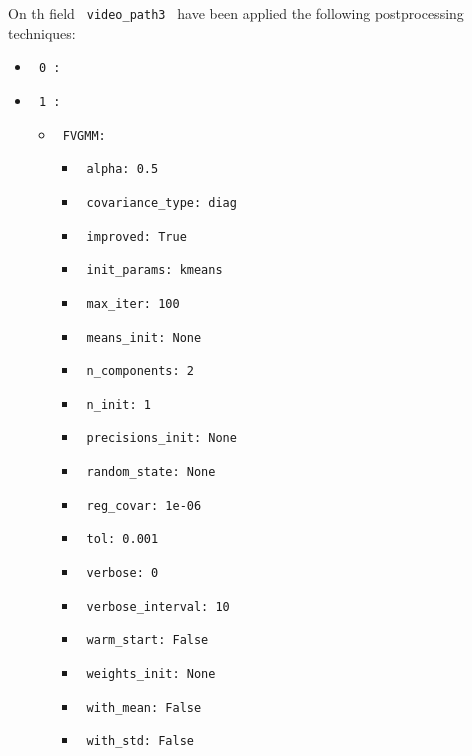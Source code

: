 \documentclass[11pt]{article}
\begin{document}
On th field \verb| video_path3 | have been applied the following postprocessing techniques:
\begin{itemize}
    \item
     \verb| 0 :|
     \begin{itemize}
           \end{itemize}
    \item
     \verb| 1 :|
     \begin{itemize}
             \item
            \verb| FVGMM: |

                   \begin{itemize}
                                    \item
                        \verb| alpha: 0.5 |
                                    \item
                        \verb| covariance_type: diag |
                                    \item
                        \verb| improved: True |
                                    \item
                        \verb| init_params: kmeans |
                                    \item
                        \verb| max_iter: 100 |
                                    \item
                        \verb| means_init: None |
                                    \item
                        \verb| n_components: 2 |
                                    \item
                        \verb| n_init: 1 |
                                    \item
                        \verb| precisions_init: None |
                                    \item
                        \verb| random_state: None |
                                    \item
                        \verb| reg_covar: 1e-06 |
                                    \item
                        \verb| tol: 0.001 |
                                    \item
                        \verb| verbose: 0 |
                                    \item
                        \verb| verbose_interval: 10 |
                                    \item
                        \verb| warm_start: False |
                                    \item
                        \verb| weights_init: None |
                                    \item
                        \verb| with_mean: False |
                                    \item
                        \verb| with_std: False |
                            \end{itemize}
       

\end{itemize}
\end{itemize}
\end{document}
